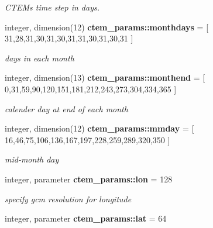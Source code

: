 \begin{DoxyCompactItemize}
\begin{DoxyCompactList}\small\item\em C\+T\+E\+M\textquotesingle{}s time step in days. \end{DoxyCompactList}\item 
\hypertarget{namespacectem__params_a4ef8efd46b3f253fcaa1d9e7626f63ff}{}integer, dimension(12) {\bfseries ctem\+\_\+params\+::monthdays} = \mbox{[} 31,28,31,30,31,30,31,31,30,31,30,31 \mbox{]}\label{namespacectem__params_a4ef8efd46b3f253fcaa1d9e7626f63ff}

\begin{DoxyCompactList}\small\item\em days in each month \end{DoxyCompactList}\item 
\hypertarget{namespacectem__params_aa3400a32285b1fb0f89ee49346af8a71}{}integer, dimension(13) {\bfseries ctem\+\_\+params\+::monthend} = \mbox{[} 0,31,59,90,120,151,181,212,243,273,304,334,365 \mbox{]}\label{namespacectem__params_aa3400a32285b1fb0f89ee49346af8a71}

\begin{DoxyCompactList}\small\item\em calender day at end of each month \end{DoxyCompactList}\item 
\hypertarget{namespacectem__params_afe122ccbefaa2e3252ce8574835068c1}{}integer, dimension(12) {\bfseries ctem\+\_\+params\+::mmday} = \mbox{[} 16,46,75,106,136,167,197,228,259,289,320,350 \mbox{]}\label{namespacectem__params_afe122ccbefaa2e3252ce8574835068c1}

\begin{DoxyCompactList}\small\item\em mid-\/month day \end{DoxyCompactList}\item 
\hypertarget{namespacectem__params_a082002b794ac9ce9b64bf0753a0a350e}{}integer, parameter {\bfseries ctem\+\_\+params\+::lon} = 128\label{namespacectem__params_a082002b794ac9ce9b64bf0753a0a350e}

\begin{DoxyCompactList}\small\item\em specify gcm resolution for longitude \end{DoxyCompactList}\item 
\hypertarget{namespacectem__params_a008acb1ee9436c954cc4988daa6e0ba0}{}integer, parameter {\bfseries ctem\+\_\+params\+::lat} = 64\label{namespacectem__params_a008acb1ee9436c954cc4988daa6e0ba0}


\end{DoxyCompactItemize}
